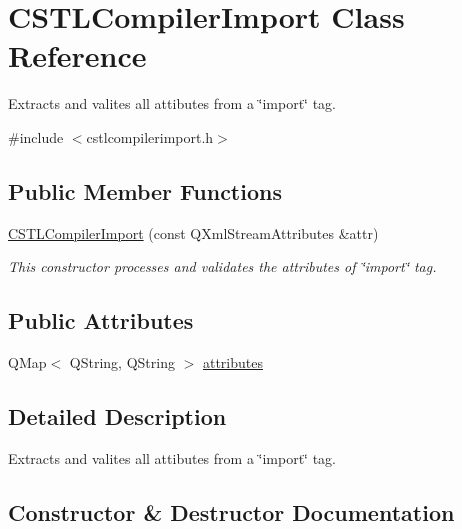 \hypertarget{class_c_s_t_l_compiler_import}{}\section{C\+S\+T\+L\+Compiler\+Import Class Reference}
\label{class_c_s_t_l_compiler_import}


Extracts and valites all attibutes from a \char`\"{}import\char`\"{} tag.  




{\ttfamily \#include $<$cstlcompilerimport.\+h$>$}

\subsection*{Public Member Functions}
\begin{DoxyCompactItemize}
\item 
\hyperlink{class_c_s_t_l_compiler_import_abf33061095db67280137700dd9c778fc}{C\+S\+T\+L\+Compiler\+Import} (const Q\+Xml\+Stream\+Attributes \&attr)
\begin{DoxyCompactList}\small\item\em This constructor processes and validates the attributes of \char`\"{}import\char`\"{} tag. \end{DoxyCompactList}\end{DoxyCompactItemize}
\subsection*{Public Attributes}
\begin{DoxyCompactItemize}
\item 
Q\+Map$<$ Q\+String, Q\+String $>$ \hyperlink{class_c_s_t_l_compiler_import_a7a5f0f43548ad8f6dd24e3d8f2b5a19c}{attributes}
\end{DoxyCompactItemize}


\subsection{Detailed Description}
Extracts and valites all attibutes from a \char`\"{}import\char`\"{} tag. 

\subsection{Constructor \& Destructor Documentation}
\mbox{\label{class_c_s_t_l_compiler_import_abf33061095db67280137700dd9c778fc}} 
